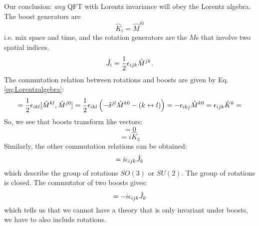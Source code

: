 Our conclusion: \emph{any} QFT with Lorentz invariance will obey the Lorentz algebra. The boost generators are
\begin{equation}
    \hat{K}_i = \hat{M}^{i0}
\end{equation}
i.e. mix space and time, and the rotation generators are the $M$s that involve two spatial indices.
\begin{equation}
    \hat{J}_i = \frac{1}{2}\epsilon_{ijk}\hat{M}^{jk}.
\end{equation}
The commutation relation between rotations and boosts are given by Eq. \eqref{eq:Lorentzalgebra}:
\begin{equation}
    [\hat{J}_i, \hat{K}_j] = \frac{1}{2}\e_{ikl}[\hat{M}^{kl}, \hat{M}^{j0}] = \frac{1}{2}\e_{ikl}\left(-\delta^{jl}\hat{M}^{k0} - (k \leftrightarrow l)\right) = -\e_{ikj}\hat{M}^{k0} = \e_{ijk}\hat{K}^k = 
\end{equation}
So, we see that boosts transform like vectors:
\begin{equation}
    [\hat{J}_1, \hat{K}_1] = 0
\end{equation}
\begin{equation}
    [\hat{J}_1, \hat{K}_2] = i\hat{K}_3
\end{equation}
Similarly, the other commutation relations can be obtained:
\begin{equation}
    [\hat{J}_i, \hat{J}_j] = i\e_{ijk}\hat{J}_k
\end{equation}
which describe the group of rotations $SO(3)$ or $SU(2)$. The group of rotations is closed. The commutator of two boosts gives:
\begin{equation}
    [\hat{K}_i, \hat{K}_j] = -i\e_{ijk}\hat{J}_k
\end{equation}
which tells us that we cannot have a theory that is only invariant under boosts, we have to also include rotations.

